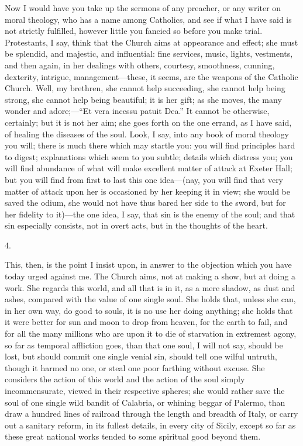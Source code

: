 Now I would have you take up the sermons of any preacher, or any
writer on moral theology, who has a name among Catholics, and see if
what I have said is not strictly fulfilled, however little you fancied
so before you make trial. Protestants, I say, think that the Church
aims at appearance and effect; she must be splendid, and majestic, and
influential: fine services, music, lights, vestments, and then again,
in her dealings with others, courtesy, smoothness, cunning, dexterity,
intrigue, management—these, it seems, are the weapons of the
Catholic Church. Well, my brethren, she cannot help succeeding, she
cannot help being strong, she cannot help being beautiful; it is her
gift; as she moves, the many wonder and adore;—``Et vera incessu
patuit Dea.'' It cannot be otherwise, certainly; but it is not her
aim; she goes forth on the one errand, as I have said, of healing the
diseases of the soul. Look, I say, into any book of moral theology you
will; there is much there which may startle you: you will find
principles hard to digest; explanations which seem to you subtle;
details which distress you; you will find abundance of what will make
excellent matter of attack at Exeter Hall; but you will find from
first to last this one idea—(nay, you will find that very matter of
attack upon her is occasioned by her keeping it in view; she would be
saved the odium, she would not have thus bared her side to the sword,
but for her fidelity to it)—the one idea, I say, that sin is the
enemy of the soul; and that sin especially consists, not in overt
acts, but in the thoughts of the heart.

4.

This, then, is the point I insist upon, in answer to the objection
which you have today urged against me. The Church aims, not at making
a show, but at doing a work. She regards this world, and all that is
in it, as a mere shadow, as dust and ashes, compared with the value of
one single soul. She holds that, unless she can, in her own way, do
good to souls, it is no use her doing anything; she holds that it were
better for sun and moon to drop from heaven, for the earth to fail,
and for all the many millions who are upon it to die of starvation in
extremest agony, so far as temporal affliction goes, than that one
soul, I will not say, should be lost, but should commit one single
venial sin, should tell one wilful untruth, though it harmed no one,
or steal one poor farthing without excuse. She considers the action of
this world and the action of the soul simply incommensurate, viewed in
their respective spheres; she would rather save the soul of one single
wild bandit of Calabria, or whining beggar of Palermo, than draw a
hundred lines of railroad through the length and breadth of Italy, or
carry out a sanitary reform, in its fullest details, in every city of
Sicily, except so far as these great national works tended to some
spiritual good beyond them.


